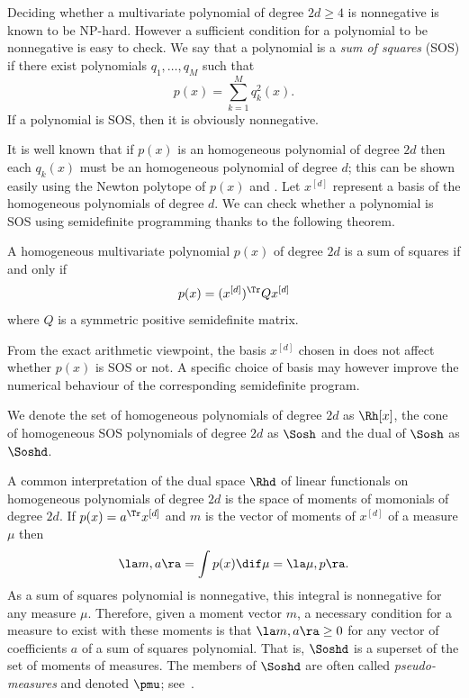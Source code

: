Deciding whether a multivariate polynomial of degree $2d \geq 4$ is nonnegative is known to be NP-hard.
However a sufficient condition for a polynomial to be nonnegative is easy to check.
We say that a polynomial is a \emph{sum of squares} (SOS) if there exist
polynomials $q_1, \ldots, q_M$ such that
\[ p(x) = \sum_{k=1}^Mq_k^2(x). \]
If a polynomial is SOS, then it is obviously nonnegative.

It is well known that if $p(x)$ is an homogeneous polynomial of degree
$2d$ then each $q_k(x)$ must be an homogeneous polynomial of degree $d$;
this can be shown easily using the Newton polytope of $p(x)$ and
\cite[Theorem~1]{reznick1978extremal}.  Let $x^{[d]}$ represent a
basis of the homogeneous polynomials of degree $d$.  We can check
whether a polynomial is SOS using semidefinite programming thanks to
the following theorem.
\begin{theorem}
  \label{theo:sos}
  A homogeneous multivariate polynomial $p(x)$ of degree $2d$ is a sum
  of squares if and only if
  \[ p(x) = (x^{[d]})^\Tr Q x^{[d]} \]
  where $Q$ is a symmetric positive semidefinite matrix.
\end{theorem}

From the exact arithmetic viewpoint, the basis $x^{[d]}$ chosen in  does
not affect whether $p(x)$ is SOS or not.  A specific choice of basis
may however improve the numerical behaviour of the corresponding
semidefinite program.

We denote the set of homogeneous polynomials of degree $2d$ as
$\Rh[x]$, the cone of homogeneous SOS polynomials of degree $2d$ as
$\Sosh$ and the dual of $\Sosh$ as $\Soshd$.

A common interpretation of the dual space $\Rhd$ of linear functionals on homogeneous polynomials of degree $2d$ is the space of moments of momonials of degree $2d$.
If $p(x) = a^\Tr x^{[d]}$ and $m$ is the vector of moments of $x^{[d]}$ of a measure $\mu$ then
\[ \la m, a \ra = \int p(x) \dif \mu = \la \mu, p \ra. \]
As a sum of squares polynomial is nonnegative,
this integral is nonnegative for any measure $\mu$.
Therefore, given a moment vector $m$, a necessary condition for a measure to exist with these moments is that $\la m, a \ra \geq 0$ for any vector of coefficients $a$ of a sum of squares polynomial.
That is, $\Soshd$ is a superset of the set of moments of measures.
The members of $\Soshd$ are often called \emph{pseudo-measures} and denoted $\pmu$; see~\cite{barak2012hypercontractivity}.
